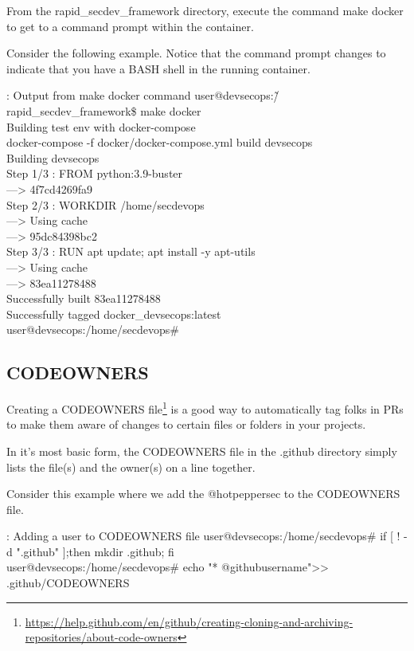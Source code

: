 From the rapid\_secdev\_framework directory, execute the command
make docker to get to a command prompt within the container.

Consider the following example. Notice that the command prompt changes
to indicate that you have a BASH shell in the running container.

\begin{mybox}{\thetcbcounter: Output from make docker command}
      user@devsecops:\~/rapid\_secdev\_framework\$ make docker\\
      Building test env with docker-compose\\
      docker-compose -f docker/docker-compose.yml build devsecops\\
      Building devsecops\\
      Step 1/3 : FROM python:3.9-buster\\
      ---> 4f7cd4269fa9\\
      Step 2/3 : WORKDIR /home/secdevops\\
      ---> Using cache\\
      ---> 95dc84398bc2\\
      Step 3/3 : RUN apt update; apt install -y apt-utils\\
      ---> Using cache\\
      ---> 83ea11278488\\
      Successfully built 83ea11278488\\
      Successfully tagged docker\_devsecops:latest\\
      user@devsecops:/home/secdevops\#
\end{mybox}


\subsection{CODEOWNERS}

\justify
Creating a CODEOWNERS file\footnote{\url{https://help.github.com/en/github/creating-cloning-and-archiving-repositories/about-code-owners}}
is a good way to automatically tag folks in PRs to make them aware of
changes to certain files or folders in your projects.

\justify
In it's most basic form, the CODEOWNERS file in the .github directory
simply lists the file(s) and the owner(s) on a line together.

\justify
Consider this example where we add the @hotpeppersec to the CODEOWNERS
file.

\begin{mybox}{\thetcbcounter: Adding a user to CODEOWNERS file}
      user@devsecops:/home/secdevops\# if [ ! -d ".github" ];then mkdir .github; fi\\
      user@devsecops:/home/secdevops\# echo "* @githubusername">> .github/CODEOWNERS
\end{mybox}


